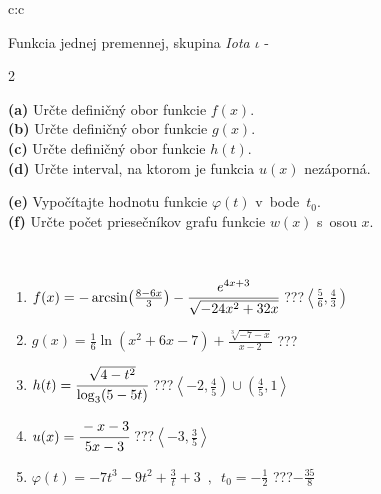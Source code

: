 \documentclass[10pt]{report}
\begin{document}
\begin{tabular}{c:c}
\begin{minipage}[c][104.5mm][t]{0.5\linewidth}
\begin{center}
\vspace{7mm}
{\huge Funkcia jednej premennej, skupina \textit{Iota $\iota$} -}\\[5mm]
\begin{minipage}{0.95\linewidth}
\begin{center}
{\small \begin{multicols}{2} \raggedright
\textbf{(a)} Určte definičný obor funkcie \(f(x)\). \\[1mm]
\textbf{(b)} Určte definičný obor funkcie \(g(x)\). \\[1mm]
\textbf{(c)} Určte definičný obor funkcie \(h(t)\). \\[1mm]
\textbf{(d)} Určte interval, na ktorom je funkcia \(u(x)\) nezáporná. \par \columnbreak
\textbf{(e)} Vypočítajte hodnotu funkcie \(\varphi(t)\) v~bode~\(t_0\). \\[1mm]
\textbf{(f)} Určte počet priesečníkov grafu funkcie \(w(x)\) s~osou \(x\). \\[1mm]
\end{multicols}
}
\end{center}
\end{minipage}
\\[4mm]
\begin{minipage}{0.79\linewidth}
\begin{center}
\begin{varwidth}{\linewidth}
\begin{enumerate}
\small
\item $f(x) = -\arcsin\!\left( \frac{8-6x}{3} \right) - \cfrac{e^{4x+3}}{\sqrt{-24x^2+32x}}$\quad \dotfill\; ???\;\dotfill \quad $\left\langle\frac{5}{6} , \frac{4}{3}\right)$
\item $g(x) = \frac{1}{6} \ln{\!(x^2+6x-7)}+\frac{\sqrt[3]{-7-x}}{x-2}$\quad \dotfill\; ???\;\dotfill {}
\item $h(t) = \cfrac{\sqrt{4-t^2}}{\log_3(5-5t)}$\quad \dotfill\; ???\;\dotfill \quad $\left\langle-2 , \frac{4}{5}\right)\cup\left(\frac{4}{5} , 1\right\rangle$
\item $u(x) = \cfrac{-x-3}{5x-3}$\quad \dotfill\; ???\;\dotfill \quad $\left\langle-3 , \frac{3}{5}\right\rangle$
\item $\varphi(t) = -7t^3-9t^2+\frac{3}{t}+3 \enspace , \enspace t_0=-\frac{1}{2}$\quad \dotfill\; ???\;\dotfill \quad $-\frac{35}{8}$

\end{enumerate}
\end{varwidth}
\end{center}
\end{minipage}
\end{center}
\end{minipage}
\end{tabular}
\end{document}
